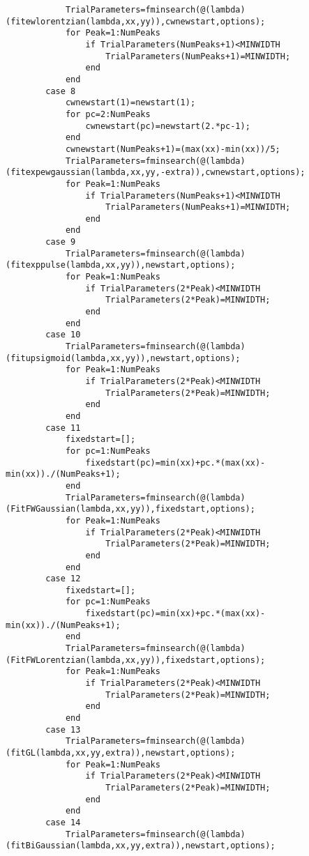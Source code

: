 \begin{lstlisting}
            TrialParameters=fminsearch(@(lambda)(fitewlorentzian(lambda,xx,yy)),cwnewstart,options);
            for Peak=1:NumPeaks
                if TrialParameters(NumPeaks+1)<MINWIDTH
                    TrialParameters(NumPeaks+1)=MINWIDTH;
                end
            end
        case 8
            cwnewstart(1)=newstart(1);
            for pc=2:NumPeaks
                cwnewstart(pc)=newstart(2.*pc-1);
            end
            cwnewstart(NumPeaks+1)=(max(xx)-min(xx))/5;
            TrialParameters=fminsearch(@(lambda)(fitexpewgaussian(lambda,xx,yy,-extra)),cwnewstart,options);
            for Peak=1:NumPeaks
                if TrialParameters(NumPeaks+1)<MINWIDTH
                    TrialParameters(NumPeaks+1)=MINWIDTH;
                end
            end
        case 9
            TrialParameters=fminsearch(@(lambda)(fitexppulse(lambda,xx,yy)),newstart,options);
            for Peak=1:NumPeaks
                if TrialParameters(2*Peak)<MINWIDTH
                    TrialParameters(2*Peak)=MINWIDTH;
                end
            end
        case 10
            TrialParameters=fminsearch(@(lambda)(fitupsigmoid(lambda,xx,yy)),newstart,options);
            for Peak=1:NumPeaks
                if TrialParameters(2*Peak)<MINWIDTH
                    TrialParameters(2*Peak)=MINWIDTH;
                end
            end
        case 11
            fixedstart=[];
            for pc=1:NumPeaks
                fixedstart(pc)=min(xx)+pc.*(max(xx)-min(xx))./(NumPeaks+1);
            end
            TrialParameters=fminsearch(@(lambda)(FitFWGaussian(lambda,xx,yy)),fixedstart,options);
            for Peak=1:NumPeaks
                if TrialParameters(2*Peak)<MINWIDTH
                    TrialParameters(2*Peak)=MINWIDTH;
                end
            end
        case 12
            fixedstart=[];
            for pc=1:NumPeaks
                fixedstart(pc)=min(xx)+pc.*(max(xx)-min(xx))./(NumPeaks+1);
            end
            TrialParameters=fminsearch(@(lambda)(FitFWLorentzian(lambda,xx,yy)),fixedstart,options);
            for Peak=1:NumPeaks
                if TrialParameters(2*Peak)<MINWIDTH
                    TrialParameters(2*Peak)=MINWIDTH;
                end
            end
        case 13
            TrialParameters=fminsearch(@(lambda)(fitGL(lambda,xx,yy,extra)),newstart,options);
            for Peak=1:NumPeaks
                if TrialParameters(2*Peak)<MINWIDTH
                    TrialParameters(2*Peak)=MINWIDTH;
                end
            end
        case 14
            TrialParameters=fminsearch(@(lambda)(fitBiGaussian(lambda,xx,yy,extra)),newstart,options);

\end{lstlisting}
